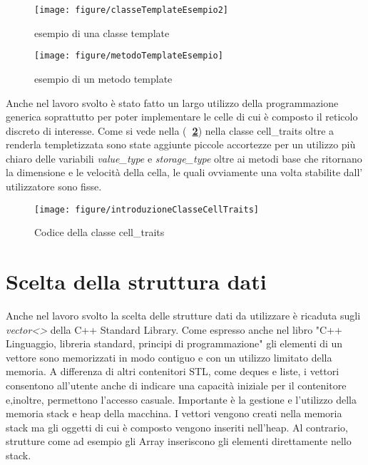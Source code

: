 {\begin{figure}[!htb]
	\begin{minipage}[c]{.40\textwidth}
		\vspace{0.3 cm}
		\texttt{[image: figure/classeTemplateEsempio2]}
		\caption{esempio di una classe template \label{fig:classeTemplateEsempio}}
	\end{minipage}
	\hspace{1.2 cm}	
	\begin{minipage}{.40\textwidth}
		\texttt{[image: figure/metodoTemplateEsempio]}
		\caption{esempio di  un metodo template \label{fig:metodoTemplateEsempio}}
	\end{minipage}
\end{figure}
\vspace{1 cm}

Anche nel lavoro svolto \`e stato fatto un largo utilizzo della programmazione generica soprattutto per poter implementare le celle di cui \`e composto il reticolo discreto di interesse. Come si vede nella (\textbf{\figurename~\ref{fig:introduzioneClasseCellTraits2}}) nella classe cell\_traits oltre a renderla templetizzata sono state aggiunte piccole accortezze per un utilizzo pi\`u chiaro delle variabili \textit{value\_type} e \textit{storage\_type} oltre ai metodi base che ritornano la dimensione e le velocit\`a della cella, le quali ovviamente una volta stabilite dall' utilizzatore sono fisse.

\begin{figure}[!htb]
	\begin{center}
		\texttt{[image: figure/introduzioneClasseCellTraits]}
	\end{center}
	\caption{Codice della classe cell\_traits  \label{fig:introduzioneClasseCellTraits2}}
\end{figure}

\section{Scelta della struttura dati}
Anche nel lavoro svolto la scelta delle strutture dati da utilizzare \`e ricaduta sugli \textit{vector<>} della C++ Standard Library.
Come espresso anche nel libro "C++ Linguaggio, libreria standard, principi di programmazione" \cite{C:2000} gli elementi di un vettore sono memorizzati in modo contiguo e con un utilizzo limitato della memoria. A differenza di altri contenitori STL, come deques e liste, i vettori consentono all'utente anche di indicare una capacit\`a iniziale per il contenitore e,inoltre, permettono l'accesso casuale.
Importante \`e la gestione e l'utilizzo della memoria stack e heap della macchina. I vettori vengono creati nella memoria stack ma gli oggetti di cui \`e composto vengono inseriti nell'heap. Al contrario, strutture come ad esempio gli Array inseriscono gli elementi direttamente nello stack.

}
